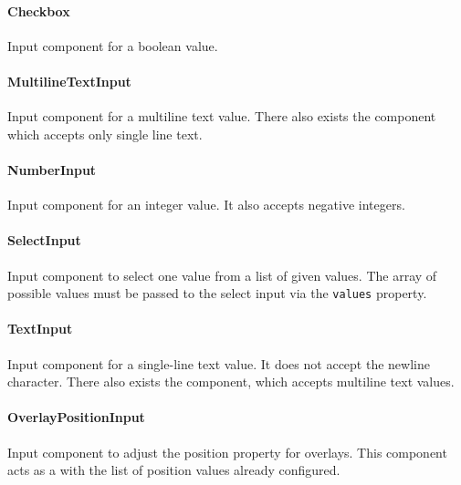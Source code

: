 \paragraph{Checkbox}
\label{sec:component-checkbox}
Input component for a boolean value.

\paragraph{MultilineTextInput}
\label{sec:component-multiline-text-input}
Input component for a multiline text value. 
There also exists the  component which accepts only single line text.

\paragraph{NumberInput}
\label{sec:component-number-input}
Input component for an integer value. 
It also accepts negative integers.

\paragraph{SelectInput}
\label{sec:component-select-input}
Input component to select one value from a list of given values. 
The array of possible values must be passed to the select input via the \texttt{values} property.

\paragraph{TextInput}
\label{sec:component-text-input}
Input component for a single-line text value. 
It does not accept the newline character. 
There also exists the  component, which accepts multiline text values.

\paragraph{OverlayPositionInput}
\label{sec:component-overlay-position-input}
Input component to adjust the position property for overlays. 
This component acts as a  with the list of position values already configured.
